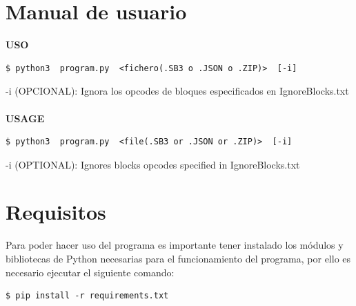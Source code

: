 \documentclass[a4paper, 12pt]{book}
\begin{document}

\cleardoublepage
\appendix
\chapter{Manual de usuario}
\label{app:manual}


\textbf{USO}
\begin{lstlisting}[style=consola,numbers=none]
$ python3  program.py  <fichero(.SB3 o .JSON o .ZIP)>  [-i]
\end{lstlisting}

-i (OPCIONAL): Ignora los opcodes de bloques especificados en IgnoreBlocks.txt
\\\\
\textbf{USAGE}
\begin{lstlisting}[style=consola,numbers=none]
$ python3  program.py  <file(.SB3 or .JSON or .ZIP)>  [-i]
\end{lstlisting}

-i (OPTIONAL): Ignores blocks opcodes specified in IgnoreBlocks.txt

\chapter{Requisitos}
\label{app:requisitos}

Para poder hacer uso del programa es importante tener instalado los módulos y bibliotecas de Python necesarias para el funcionamiento del programa,  por ello es necesario ejecutar el siguiente comando:

\begin{lstlisting}[style=consola,numbers=none]
$ pip install -r requirements.txt
\end{lstlisting}
\end{document}
